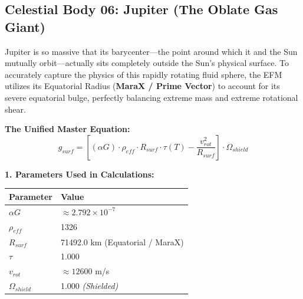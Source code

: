 \documentclass[11pt, a4paper]{article}
\begin{document}
\clearpage
\subsection{Celestial Body 06: Jupiter (The Oblate Gas Giant)}
  Jupiter is so massive that its barycenter—the point around which it and the Sun mutually orbit—actually sits completely outside the Sun's physical surface. To accurately capture the physics of this rapidly rotating fluid sphere, the EFM utilizes its Equatorial Radius (\textbf{MaraX / Prime Vector}) to account for its severe equatorial bulge, perfectly balancing extreme mass and extreme rotational shear.

  \vspace{0.5em}
  \noindent \textbf{The Unified Master Equation:}
  $$ g_{surf} = \left[ (\alpha G) \cdot \rho_{eff} \cdot R_{surf} \cdot \tau(T) - \frac{v_{rot}^2}{R_{surf}} \right] \cdot \Omega_{shield} $$

  \vspace{0.5em}
  \noindent \textbf{1. Parameters Used in Calculations:} \\[0.5em]
  \begingroup
  \renewcommand{\arraystretch}{1.3}
  \hspace*{2em}
  \begin{tabular}{|l|l|}
    \hline
    \textbf{Parameter} & \textbf{Value} \\ \hline
    $\alpha G$ & $\approx 2.792 \times 10^{-7}$ \\ \hline
    $\rho_{eff}$ & 1326 \\ \hline
    $R_{surf}$ & 71492.0 km (Equatorial / MaraX) \\ \hline
    $\tau$ & 1.000 \\ \hline
    $v_{rot}$ & $\approx 12600$ m/s \\ \hline
    $\Omega_{shield}$ & 1.000 \textit{(Shielded)} \\ \hline
  \end{tabular}
  \endgroup
\end{document}
